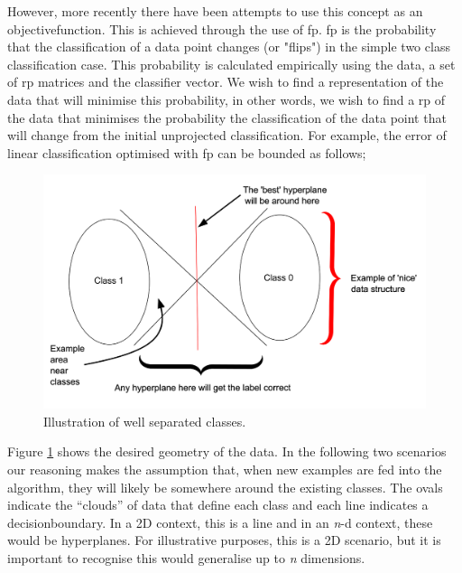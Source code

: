 However, more recently there have been attempts to use this concept as an \gls{objectivefunction}. This is achieved through the use of \gls{fp}. \gls{fp} is the probability that the classification of a data point changes (or "flips") in the simple two class classification case. This probability is calculated empirically using the data, a set of \gls{rp} matrices and the classifier vector. We wish to find a representation of the data that will minimise this probability, in other words, we wish to find a \gls{rp} of the data that minimises the probability the classification of the data point that will change from the initial unprojected classification. For example, the error of linear classification optimised with \gls{fp} can be bounded as follows;




\begin{figure}[h]
\centering
\includegraphics[width=\textwidth]{figs/hyperplanes_good_classes.png}
%
\caption{Illustration of well separated classes.} 
\label{fig:good_sep_classes} %
\end{figure}

Figure \ref{fig:good_sep_classes} shows the desired geometry of the data. In the following two scenarios our reasoning makes the assumption that, when new examples are fed into the algorithm, they will likely be somewhere around the existing classes. The ovals indicate the \enquote{clouds} of data that define each class and each line indicates a \gls{decisionboundary}. In a 2D context, this is a line and in an \textit{n}-d context, these would be \gls{hyperplane}s. For illustrative purposes, this is a 2D scenario, but it is important to recognise this would generalise up to \textit{n} dimensions.
\bigskip


